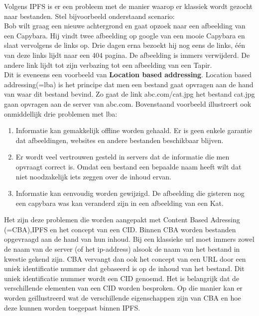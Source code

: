Volgens IPFS is er een probleem met de manier waarop er klassiek wordt gezocht naar bestanden. Stel bijvoorbeeld onderstaand scenario:\\

Bob wilt graag een nieuwe achtergrond en gaat opzoek naar een afbeelding van een Capybara. Hij vindt twee afbeelding op google van een mooie Capybara en slaat vervolgens de links op. Drie dagen erna bezoekt hij nog eens de links, één van deze links lijdt naar een 404 pagina. De afbeelding is immers verwijderd. De andere link lijdt tot zijn verbazing tot een afbeelding van een Tapir.\\

Dit is eveneens een voorbeeld van \textbf{Location based addressing}. Location based addressing(=lba) is het principe dat men een bestand gaat opvragen aan de hand van waar dit bestand bevind. Zo gaat de link abc.com/cat.jpg het bestand cat.jpg gaan opvragen aan de server van abc.com. Bovenstaand voorbeeld illustreert ook onmiddellijk drie problemen met lba:

\begin{enumerate}
\item Informatie kan gemakkelijk offline worden gehaald. Er is geen enkele garantie dat afbeeldingen, websites en andere bestanden beschikbaar blijven.\\
\item Er wordt veel vertrouwen gesteld in servers dat de informatie die men opvraagt correct is. Omdat een bestand een bepaalde naam heeft wilt dat niet noodzakelijk iets zeggen over de inhoud ervan.\\
\item Informatie kan eenvoudig worden gewijzigd. De afbeelding die gisteren nog een capybara was kan veranderd zijn in een afbeelding van een Kat.\\
\end{enumerate}

Het zijn deze problemen die worden aangepakt met Content Based Adressing (=CBA),IPFS en het concept van een CID. Binnen CBA worden bestanden opgevraagd aan de hand van hun inhoud. Bij een klassieke url moet immers zowel de naam van de server (of het ip-address) alsook de naam van het bestand in kwestie gekend zijn. CBA vervangt dan ook het concept van een URL door een uniek identificatie nummer dat gebaseerd is op de inhoud van het bestand. Dit uniek identificatie nummer wordt een CID genoemd. Het is belangrijk dat de verschillende elementen van een CID worden besproken. Op die manier kan er worden geïllustreerd wat de verschillende eigenschappen zijn van CBA en hoe deze kunnen worden toegepast binnen IPFS.\\

